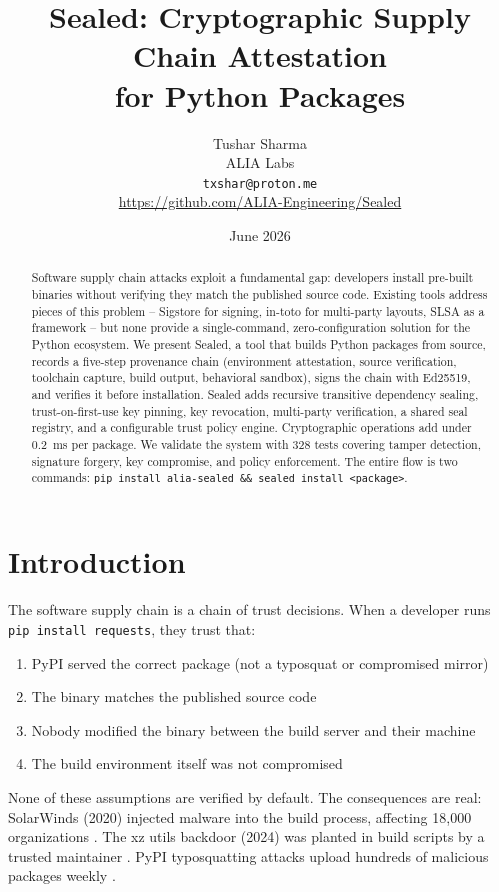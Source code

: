 \documentclass[11pt,a4paper]{article}
\title{\textbf{Sealed: Cryptographic Supply Chain Attestation\\for Python Packages}}
\author{
  Tushar Sharma \\
  ALIA Labs \\
  \texttt{txshar@proton.me} \\
  \url{https://github.com/ALIA-Engineering/Sealed}
}
\date{June 2026}
\begin{document}
\maketitle
\thispagestyle{fancy}

\begin{abstract}
Software supply chain attacks exploit a fundamental gap: developers install pre-built binaries without verifying they match the published source code. Existing tools address pieces of this problem -- Sigstore for signing, in-toto for multi-party layouts, SLSA as a framework -- but none provide a single-command, zero-configuration solution for the Python ecosystem. We present Sealed, a tool that builds Python packages from source, records a five-step provenance chain (environment attestation, source verification, toolchain capture, build output, behavioral sandbox), signs the chain with Ed25519, and verifies it before installation. Sealed adds recursive transitive dependency sealing, trust-on-first-use key pinning, key revocation, multi-party verification, a shared seal registry, and a configurable trust policy engine. Cryptographic operations add under 0.2~ms per package. We validate the system with 328 tests covering tamper detection, signature forgery, key compromise, and policy enforcement. The entire flow is two commands: \texttt{pip install alia-sealed \&\& sealed install <package>}.
\end{abstract}

\section{Introduction}

The software supply chain is a chain of trust decisions. When a developer runs \texttt{pip install requests}, they trust that:

\begin{enumerate}
  \item PyPI served the correct package (not a typosquat or compromised mirror)
  \item The binary matches the published source code
  \item Nobody modified the binary between the build server and their machine
  \item The build environment itself was not compromised
\end{enumerate}

None of these assumptions are verified by default. The consequences are real: SolarWinds (2020) injected malware into the build process, affecting 18,000 organizations \cite{solarwinds}. The xz utils backdoor (2024) was planted in build scripts by a trusted maintainer \cite{xz}. PyPI typosquatting attacks upload hundreds of malicious packages weekly \cite{typosquat}.
\end{document}
